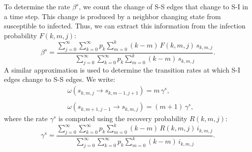 To determine the rate $\beta^s$, we count the change of S-S edges that change to S-I in a time step. This change is produced by a neighbor changing state from susceptible to infected. Thus, we can extract this information from the infection probability $F (k,m,j) $:
\begin{equation}
        \label{beta_s}
        \beta^s = \frac{\sum_{j=0}^{\infty} \sum_{k=0}^{\infty} p_k \sum_{m = 0}^{k} (k - m)\, F (k,m,j) \, s_{k,m,j}}{\sum_{j=0}^{\infty} \sum_{k=0}^{\infty} p_k \sum_{m = 0}^{k} (k - m) \, s_{k,m,j}}.
\end{equation}
A similar approximation is used to determine the transition rates at which S-I edges change to S-S edges. We write:
\begin{align} \label{rate_gamma_s}
    &  \omega (s_{k,m,j} \to s_{k,m-1,j+1}) = m\, \gamma^{s}, \nonumber \\
    \\
    & \omega (s_{k,m+1,j-1} \to s_{k,m,j}) = (m + 1)\, \gamma^{s} , \nonumber
\end{align}
where the rate $\gamma^s$ is computed using the recovery probability $R (k,m,j)$:
\begin{equation}
        \label{gamma_s}
        \gamma^s = \frac{\sum_{j=0}^{\infty} \sum_{k=0}^{\infty} p_k \sum_{m = 0}^{k} (k - m)\, R (k,m,j)\, i_{k,m,j}}{\sum_{j=0}^{\infty} \sum_{k=0}^{\infty} p_k \sum_{m = 0}^{k} (k - m)\,  i_{k,m,j}}.
\end{equation}
    
